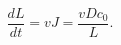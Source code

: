 \documentclass[preview]{standalone}
\begin{document}
\[\frac{dL}{dt} = v J = \frac{v D c_0}{L}.\]
\end{document}
